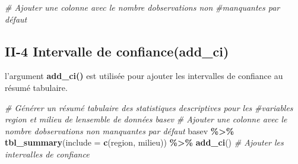 \documentclass[
]{article}
\newenvironment{Shaded}{\begin{snugshade}}{\end{snugshade}}
\newcommand{\AttributeTok}[1]{\textcolor[rgb]{0.13,0.29,0.53}{#1}}
\newcommand{\CommentTok}[1]{\textcolor[rgb]{0.56,0.35,0.01}{\textit{#1}}}
\newcommand{\FunctionTok}[1]{\textcolor[rgb]{0.13,0.29,0.53}{\textbf{#1}}}
\newcommand{\NormalTok}[1]{#1}
\newcommand{\SpecialCharTok}[1]{\textcolor[rgb]{0.81,0.36,0.00}{\textbf{#1}}}
\begin{document}
\begin{Shaded}
\begin{Highlighting}[]
\CommentTok{\# Ajouter une colonne avec le nombre d\textquotesingle{}observations non }
\CommentTok{\#manquantes par défaut}
\end{Highlighting}
\end{Shaded}

\hypertarget{ii-4-intervalle-de-confianceadd_ci}{%
\subsection{II-4 Intervalle de
confiance(add\_ci)}\label{ii-4-intervalle-de-confianceadd_ci}}

l'argument \textbf{add\_ci()} est utilisée pour ajouter les intervalles
de confiance au résumé tabulaire.

\begin{Shaded}
\begin{Highlighting}[]
\CommentTok{\# Générer un résumé tabulaire des statistiques descriptives pour les }
\CommentTok{\#variables \textquotesingle{}region\textquotesingle{} et \textquotesingle{}milieu\textquotesingle{} de l\textquotesingle{}ensemble de données \textquotesingle{}basev\textquotesingle{}}
\CommentTok{\# Ajouter une colonne avec le nombre d\textquotesingle{}observations non manquantes par défaut}
\NormalTok{basev }\SpecialCharTok{\%\textgreater{}\%}
  \FunctionTok{tbl\_summary}\NormalTok{(}\AttributeTok{include =} \FunctionTok{c}\NormalTok{(region, milieu)) }\SpecialCharTok{\%\textgreater{}\%}
  \FunctionTok{add\_ci}\NormalTok{() }\CommentTok{\# Ajouter les intervalles de confiance}
\end{Highlighting}
\end{Shaded}
\end{document}
